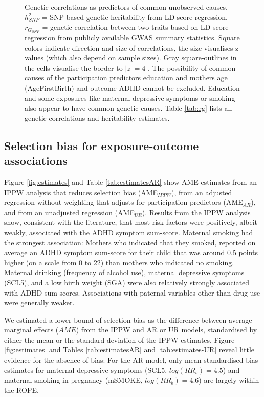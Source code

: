 \documentclass[12pt]{article}
\begin{document}
\begin{figure}
	\begin{center}
	\end{center}
	\caption{Genetic correlations as predictors of common unobserved causes. $h^2_{SNP}$ = SNP based genetic heritability from LD score regression. $r_{G_{SNP}}$ = genetic correlation between two traits based on LD score regression from publicly available GWAS summary statistics. Square colors indicate direction and size of correlations, the size visualises z-values (which also depend on sample sizes). Gray square-outlines in the cells visualise the border to $|z|=4$ . The possibility of common causes of the participation predictors education and mothers age (AgeFirstBirth) and outcome ADHD cannot be excluded. Education and some exposures like maternal depressive symptoms or smoking also appear to have common genetic causes. Table \ref{tab:rg} lists all genetic correlations and heritability estimates.}
	\label{fig:rg}
\end{figure}

\subsection*{Selection bias for exposure-outcome associations}
Figure \ref{fig:estimates} and Table \ref{tab:estimatesAR} show AME estimates from an IPPW analysis that reduces selection bias (AME$_{IPPW}$), from an adjusted regression without weighting that adjusts for participation predictors (AME$_{AR}$), and from an unadjusted regression (AME$_{UR}$). Results from the IPPW analysis show, consistent with the literature, that most risk factors were positively, albeit weakly, associated with the ADHD symptom sum-score. Maternal smoking had the strongest association: Mothers who indicated that they smoked, reported on average an ADHD symptom sum-score for their child that was around 0.5 points higher (on a scale from 0 to 22) than mothers who indicated no smoking. Maternal drinking (frequency of alcohol use), maternal depressive symptoms (SCL5), and a low birth weight (SGA) were also relatively strongly associated with ADHD sum scores. Associations with paternal variables other than drug use were generally weaker.

We estimated a lower bound of selection bias as the difference between average marginal effects ($AME$) from the IPPW and AR or UR models, standardised by either the mean or the standard deviation of the IPPW estimates. Figure \ref{fig:estimates} and Tables \ref{tab:estimatesAR} and \ref{tab:estimates-UR} reveal little evidence for the absence of bias: For the AR model, only mean-standardised bias estimates for maternal depressive symptoms (SCL5, $log(RR_b)=4.5$) and maternal smoking in pregnancy (mSMOKE, $log(RR_b)=4.6$) are largely within the ROPE. 
\end{document}
